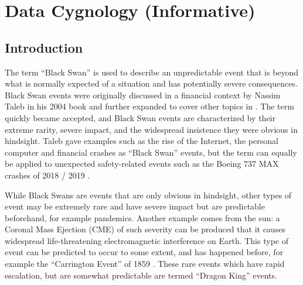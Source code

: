 %
\section{Data Cygnology (Informative)}\label{bkm:cygnology}
%

\subsection{Introduction}
The term “Black Swan” is used to describe an unpredictable event that is beyond what is normally expected of a situation and has potentially severe consequences.
Black Swan events were originally discussed in a financial context by Nassim Taleb in his 2004 book
 \cite{citation:cyg:RoleOfChance}
and further expanded to cover other topics in
\cite{citation:cyg:BlackSwan}.
The term quickly became accepted, and Black Swan events are characterized by their extreme rarity, severe impact, and the widespread insistence they were obvious in hindsight. Taleb gave examples such as the rise of the Internet, the personal computer and financial crashes as “Black Swan” events, but the term can equally be applied to unexpected safety-related events such as the Boeing 737 MAX crashes of 2018 / 2019 \cite{citation:cyg:737Max}.

While Black Swans are events that are only obvious in hindsight, other types of event may be extremely rare and have severe impact but are predictable beforehand, for example pandemics.
Another example comes from the sun:  a Coronal Mass Ejection (CME) of such severity can be produced that it causes widespread life-threatening electromagnetic interference on Earth.
This type of event can be predicted to occur to some extent, and has happened before, for example the “Carrington Event” of 1859 \cite{citation:cyg:carrington}.
These rare events which have rapid escalation, but are somewhat predictable are termed “Dragon King” events.

